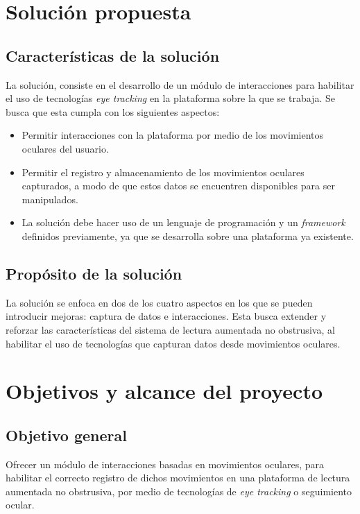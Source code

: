 \section{Soluci\'on propuesta}
\label{intro:solucion}
\subsection{Características de la solución}
La solución, consiste en el desarrollo de un módulo de interacciones para habilitar el uso de tecnologías \textit{eye tracking} en la plataforma sobre la que se trabaja. Se busca que esta cumpla con los siguientes aspectos:
\begin{itemize}
    \item Permitir interacciones con la plataforma por medio de los movimientos oculares del usuario. %
    \item Permitir el registro y almacenamiento de los movimientos oculares capturados, a modo de que estos datos se encuentren disponibles para ser manipulados.
    \item La solución debe hacer uso de un lenguaje de programación y un \textit{framework} definidos previamente, ya que se desarrolla sobre una plataforma ya existente.
\end{itemize}

\subsection{Propósito de la solución}
La solución se enfoca en dos de los cuatro aspectos en los que se pueden introducir mejoras: captura de datos e interacciones. Esta busca extender y reforzar las características del sistema de lectura aumentada no obstrusiva, al habilitar el uso de tecnologías que capturan datos desde movimientos oculares.

\section{Objetivos y alcance del proyecto}
\label{intro:objetivos}

\subsection{Objetivo general}
Ofrecer un módulo de interacciones basadas en movimientos oculares, para habilitar el correcto registro de dichos movimientos en una plataforma de lectura aumentada no obstrusiva, por medio de tecnologías de \textit{eye tracking} o seguimiento ocular.

